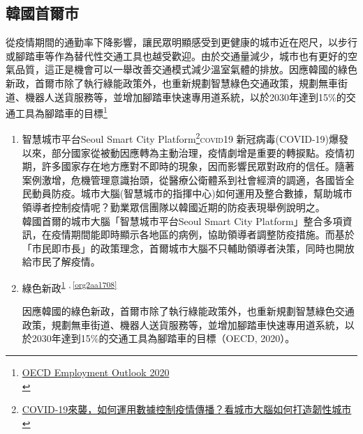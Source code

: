 \documentclass[a4paper,12pt]{article}
\begin{document}
\subsection{韓國首爾市}
\label{sec:org840c3ba}
從疫情期間的通勤率下降影響，讓民眾明顯感受到更健康的城市近在咫尺，以步行或腳踏車等作為替代性交通工具也越受歡迎。由於交通量減少，城市也有更好的空氣品質，這正是機會可以一舉改善交通模式減少溫室氣體的排放。因應韓國的綠色新政，首爾市除了執行綠能政策外，也重新規劃智慧綠色交通政策，規劃無車街道、機器人送貨服務等，並增加腳踏車快速專用道系統，以於2030年達到15\%的交通工具為腳踏車的目標\footnote{\href{https://www.oecd-ilibrary.org/employment/oecd-employment-outlook-2020\_1686c758-en}{OECD Employment Outlook 2020 }\\\label{org2f33b94}}\\
\begin{enumerate}
\item 智慧城市平台Seoul Smart City Platform\footnote{\href{https://www2.deloitte.com/tw/tc/pages/risk/articles/city-brain-resilience.html}{COVID-19來襲，如何運用數據控制疫情傳播？看城市大腦如何打造韌性城市}\\\label{org4199914}}\hfill{}\textsc{covid19}
\label{sec:org7c967d0}
新冠病毒(COVID-19)爆發以來，部分國家從被動因應轉為主動治理，疫情劇增是重要的轉捩點。疫情初期，許多國家存在地方應對不即時的現象，因而影響民眾對政府的信任。隨著案例激增，危機管理意識抬頭，從醫療公衛體系到社會經濟的調適，各國皆全民動員防疫。城市大腦(智慧城市的指揮中心)如何運用及整合數據，幫助城市領導者控制疫情呢？勤業眾信團隊以韓國近期的防疫表現舉例說明之。\\

韓國首爾的城市大腦「智慧城市平台Seoul Smart City Platform」整合多項資訊，在疫情期間能即時顯示各地區的病例，協助領導者調整防疫措施。而基於「市民即市長」的政策理念，首爾城市大腦不只輔助領導者決策，同時也開放給市民了解疫情。\\
\item 綠色新政\textsuperscript{\ref{org2f33b94}} \textsuperscript{,}\,\textsuperscript{\ref{org2aa1708}}
\label{sec:org17845c7}

因應韓國的綠色新政，首爾市除了執行綠能政策外，也重新規劃智慧綠色交通政策，規劃無車街道、機器人送貨服務等，並增加腳踏車快速專用道系統，以於2030年達到15\%的交通工具為腳踏車的目標（OECD, 2020）。\\
\end{enumerate}
\end{document}
